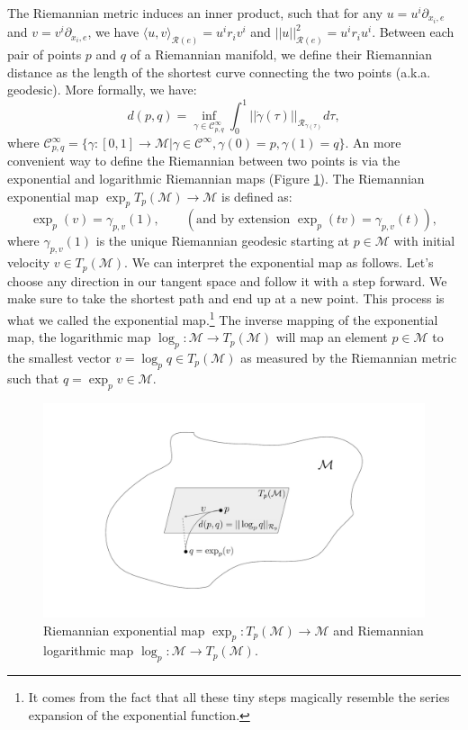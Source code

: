 \documentclass{article}
\begin{document}
The Riemannian metric induces an inner product, such that for any $u = u^i \partial_{x_i, e}$ and $v = v^i \partial_{x_i, e}$, we have $\langle u, v \rangle_{\mathcal{R}(e)} = u^i r_i v^i$ and $|| u ||_{\mathcal{R}(e)}^2 = u^i r_i u^i$. Between each pair of points $p$ and $q$ of a Riemannian manifold, we define their Riemannian distance as the length of the shortest curve connecting the two points (a.k.a. geodesic). More formally, we have:
\begin{equation}
d(p, q) = \inf_{\gamma \in \mathcal{C}^\infty_{p, q}} \int_0^1 ||\dot{\gamma}(\tau)||_{\mathcal{R}_{\gamma(\tau)}} d\tau,
\end{equation}
where $\mathcal{C}^\infty_{p, q} = \{ \gamma : [0, 1] \to \mathcal{M} | \gamma \in \mathcal{C}^\infty, \gamma(0) = p,  \gamma(1) = q\}$. An more convenient way to define the Riemannian between two points is via the exponential and logarithmic Riemannian maps (Figure \ref{fig:explogmap}). The Riemannian exponential map $\exp_p T_p(\mathcal{M}) \to \mathcal{M}$ is defined as:
\begin{equation}
\exp_p (v) = \gamma_{p, v}(1) ,\qquad (\text{and by extension } \exp_p (tv) = \gamma_{p, v}(t)),
\end{equation}
where $\gamma_{p,v}(1)$ is the unique Riemannian geodesic starting at $p \in \mathcal{M}$ with initial velocity $v \in T_p(\mathcal{M})$. We can interpret the exponential map as follows. Let’s choose any direction in our tangent space and follow it with a step forward. We make sure to take the shortest path and end up at a new point. This process is what we called the exponential map.\footnote{It comes from the fact that all these tiny steps magically resemble the series expansion of the exponential function.} The inverse mapping of the exponential map, the logarithmic map $\log_p : \mathcal{M} \to T_p(\mathcal{M})$ will map an element $p \in \mathcal{M}$ to the smallest vector $v = \log_p q \in T_p(\mathcal{M})$ as measured by the Riemannian metric such that $q = \exp_p v \in \mathcal{M}$.

\begin{figure}[h!]
    \centering
    \includegraphics[width=\textwidth]{Images/distexplog.pdf}
    \caption{Riemannian exponential map $\exp_p : T_p(\mathcal{M}) \to \mathcal{M}$ and Riemannian logarithmic map $\log_p : \mathcal{M} \to T_p(\mathcal{M})$.}
    \label{fig:explogmap}
\end{figure}
\end{document}
